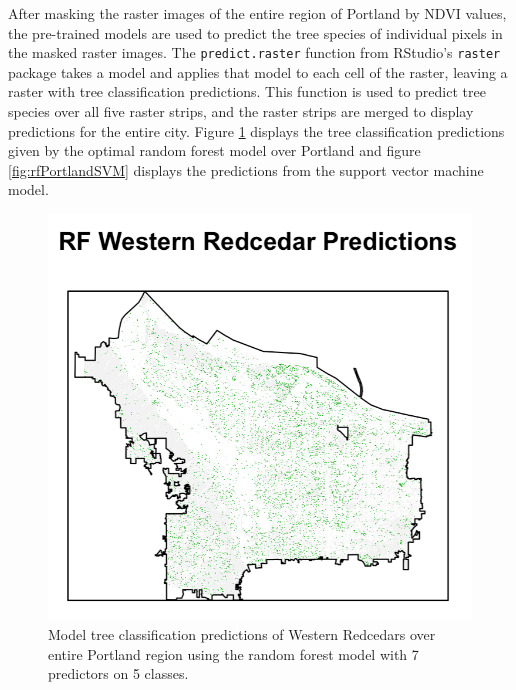 \documentclass[12pt,twoside]{reedthesis}
\begin{document}
After masking the raster images of the entire region of Portland by NDVI values, the pre-trained models are used to predict the tree species of individual pixels in the masked raster images. The \texttt{predict.raster} function from RStudio's \texttt{raster} package takes a model and applies that model to each cell of the raster, leaving a raster with tree classification predictions. This function is used to predict tree species over all five raster strips, and the raster strips are merged to display predictions for the entire city. Figure \ref{fig:rfPortlandRF} displays the tree classification predictions given by the optimal random forest model over Portland and figure \ref{fig:rfPortlandSVM} displays the predictions from the support vector machine model.
\begin{figure}

{\centering \includegraphics[width=1\linewidth]{figure/rfPortland} 

}

\caption{Model tree classification predictions of Western Redcedars over entire Portland region using the random forest model with 7 predictors on 5 classes.}\label{fig:rfPortlandRF}
\end{figure}
\end{document}
